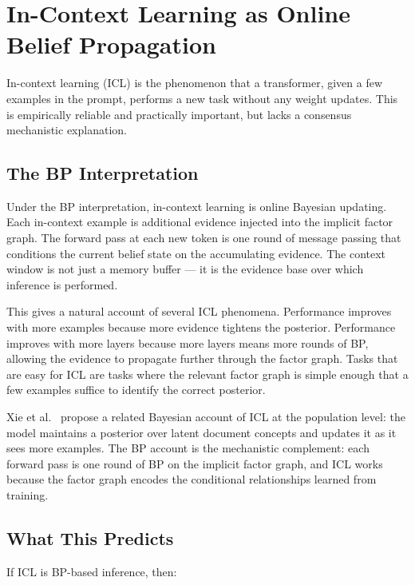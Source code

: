 \section{In-Context Learning as Online Belief Propagation}
\label{sec:icl}

In-context learning (ICL) is the phenomenon that a transformer, given a
few examples in the prompt, performs a new task without any weight updates.
This is empirically reliable and practically important, but lacks a
consensus mechanistic explanation.

\subsection*{The BP Interpretation}

Under the BP interpretation, in-context learning is online Bayesian
updating. Each in-context example is additional evidence injected into the
implicit factor graph. The forward pass at each new token is one round of
message passing that conditions the current belief state on the accumulating
evidence. The context window is not just a memory buffer --- it is the
evidence base over which inference is performed.

This gives a natural account of several ICL phenomena. Performance improves
with more examples because more evidence tightens the posterior. Performance
improves with more layers because more layers means more rounds of BP,
allowing the evidence to propagate further through the factor graph. Tasks
that are easy for ICL are tasks where the relevant factor graph is simple
enough that a few examples suffice to identify the correct posterior.

Xie et al.~\cite{xie2022icl} propose a related Bayesian account of ICL at
the population level: the model maintains a posterior over latent document
concepts and updates it as it sees more examples. The BP account is the
mechanistic complement: each forward pass is one round of BP on the implicit
factor graph, and ICL works because the factor graph encodes the conditional
relationships learned from training.

\subsection*{What This Predicts}

If ICL is BP-based inference, then:

